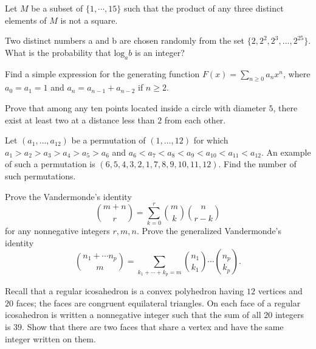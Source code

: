 \documentclass{article}
\begin{document}
\begin{exercise}
    Let $M$ be a subset of $\{1, \cdots, 15\}$ such that the product of any three distinct elements of $M$ is not a square. 
\end{exercise}

\begin{exercise}[2005 AMC 12A 23]
    Two distinct numbers a and b are chosen randomly from the set $\{2, 2^2, 2^3, ..., 2^{25}\}$. What is the probability that $\mathrm{log}_a b$ is an integer?
\end{exercise}

\begin{exercise} 
Find a simple expression for the generating function $F(x) = \sum_{n \geq 0} a_n x^n$, where $a_0 = a_1 = 1$ and $a_n = a_{n-1} + a_{n-2}$ if $n \geq 2$.
\end{exercise}

\begin{exercise}
Prove that among any ten points located inside a circle with diameter $5$, there exist at least two at a distance less than $2$ from each other. 
\end{exercise}

\begin{exercise}
Let $(a_{1}, \ldots, a_{12})$ be a permutation of $(1, \ldots, 12)$ for which $a_{1} > a_{2} > a_{3} > a_{4} > a_{5} > a_{6}$ and $a_{6} < a_{7} < a_{8} < a_{9} < a_{10} < a_{11} < a_{12}$. An example of such a permutation is $(6,5,4,3,2,1,7,8,9,10,11,12)$. Find the number of such permutations. 
\end{exercise}

\begin{exercise}
Prove the Vandermonde's identity 
\[
\binom{m + n}{r} = \sum_{k = 0}^{r} \binom{m}{k} \binom{n}{r - k}
\]
for any nonnegative integers $r, m, n$. Prove the generalized Vandermonde's identity 
\[
\binom{n_{1} + \cdots n_{p}}{m} = \sum_{k_{1} + \cdots + k_{p} = m} \binom{n_{1}}{k_{1}} \cdots \binom{n_{p}}{k_{p}}. 
\]
\end{exercise}

\begin{exercise}[2013 $A_{1}$] 
Recall that a regular icosahedron is a convex polyhedron having $12$ vertices and $20$ faces; the faces are congruent equilateral triangles. On each face of a regular icosahedron is written a nonnegative integer such that the sum of all $20$ integers is $39$. Show that there are two faces that share a vertex and have the same integer written on them.
\end{exercise}
\end{document}
